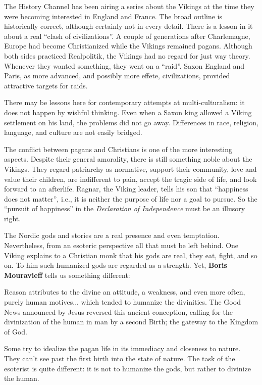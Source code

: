 The History Channel has been airing a series about the Vikings at the time they were becoming interested in England and France. The broad outline is historically correct, although certainly not in every detail. There is a lesson in it about a real ``clash of civilizations''. A couple of generations after Charlemagne, Europe had become Christianized while the Vikings remained pagans. Although both sides practiced Realpolitik, the Vikings had no regard for just way theory. Whenever they wanted something, they went on a ``raid''. Saxon England and Paris, as more advanced, and possibly more effete, civilizations, provided attractive targets for raids.

There may be lessons here for contemporary attempts at multi-culturalism: it does not happen by wishful thinking. Even when a Saxon king allowed a Viking settlement on his land, the problems did not go away. Differences in race, religion, language, and culture are not easily bridged.

The conflict between pagans and Christians is one of the more interesting aspects. Despite their general amorality, there is still something noble about the Vikings. They regard patriarchy as normative, support their community, love and value their children, are indifferent to pain, accept the tragic side of life, and look forward to an afterlife. Ragnar, the Viking leader, tells his son that ``happiness does not matter'', i.e., it is neither the purpose of life nor a goal to pursue. So the ``pursuit of happiness'' in the \emph{Declaration of Independence} must be an illusory right.

The Nordic gods and stories are a real presence and even temptation. Nevertheless, from an esoteric perspective all that must be left behind. One Viking explains to a Christian monk that his gods are real, they eat, fight, and so on. To him such humanized gods are regarded as a strength. Yet, \textbf{Boris Mouravieff} tells us something different:

\begin{quotex}
Reason attributes to the divine an attitude, a weakness, and even more often, purely human motives... which tended to humanize the divinities. The Good News announced by Jesus reversed this ancient conception, calling for the divinization of the human in man by a second Birth; the gateway to the Kingdom of God.
\end{quotex}


Some try to idealize the pagan life in its immediacy and closeness to nature. They can't see past the first birth into the state of nature. The task of the esoterist is quite different: it is not to humanize the gods, but rather to divinize the human.


